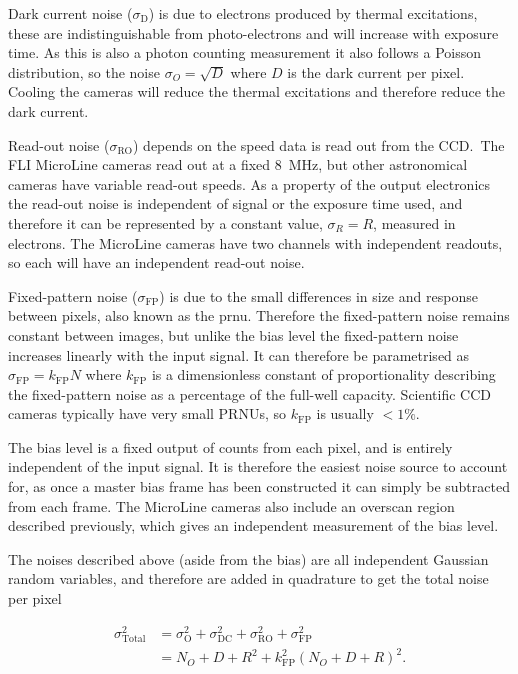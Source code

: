\begin{colsection}
\begin{colsection}
Dark current noise ($\sigma_\text{D}$) is due to electrons produced by thermal excitations, these are indistinguishable from photo-electrons and will increase with exposure time. As this is also a photon counting measurement it also follows a Poisson distribution, so the noise $\sigma_O = \sqrt{D}$ where $D$ is the dark current per pixel. Cooling the cameras will reduce the thermal excitations and therefore reduce the dark current.

Read-out noise ($\sigma_\text{RO}$) depends on the speed data is read out from the CCD.\ The FLI MicroLine cameras read out at a fixed \SI{8}{\mega\hertz}, but other astronomical cameras have variable read-out speeds. As a property of the output electronics the read-out noise is independent of signal or the exposure time used, and therefore it can be represented by a constant value, $\sigma_R = R$, measured in electrons. The MicroLine cameras have two channels with independent readouts, so each will have an independent read-out noise.

Fixed-pattern noise ($\sigma_\text{FP}$) is due to the small differences in size and response between pixels, also known as the \gls{prnu}. Therefore the fixed-pattern noise remains constant between images, but unlike the bias level the fixed-pattern noise increases linearly with the input signal. It can therefore be parametrised as $\sigma_\text{FP} = k_\text{FP}N$ where $k_\text{FP}$ is a dimensionless constant of proportionality describing the fixed-pattern noise as a percentage of the full-well capacity. Scientific CCD cameras typically have very small PRNUs, so $k_\text{FP}$ is usually $<1\%$.

The bias level is a fixed output of counts from each pixel, and is entirely independent of the input signal. It is therefore the easiest noise source to account for, as once a master bias frame has been constructed it can simply be subtracted from each frame. The MicroLine cameras also include an overscan region described previously, which gives an independent measurement of the bias level.

The noises described above (aside from the bias) are all independent Gaussian random variables, and therefore are added in quadrature to get the total noise per pixel

\begin{equation}
    \begin{split}
        \sigma_\text{Total}^2 & = \sigma_\text{O}^2 +
                                \sigma_\text{DC}^2 +
                                \sigma_\text{RO}^2 +
                                \sigma_\text{FP}^2 \\
                              & = N_O + D + R^2 + k_\text{FP}^2{(N_O + D + R)}^2.
    \end{split}
    \label{eq:noise}
\end{equation}


\end{colsection}
\end{colsection}
